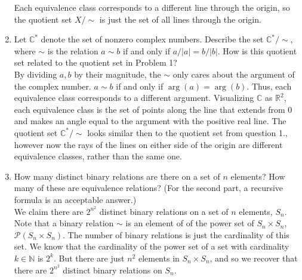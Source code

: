 \documentclass{article}
\newcommand{\C}{{\mathbb C}}
\newcommand{\R}{{\mathbb R}}
\newcommand{\N}{{\mathbb N}}
\begin{document}
\begin{enumerate}
		Each equivalence class corresponds to a different line through the origin,
		so the quotient set $X /\sim$
		is just the set of all lines through the origin.
	\item Let $\C^*$ denote the set of nonzero complex numbers.
		Describe the set $\C^*/\sim$,
		where $\sim$ is the relation $a \sim b$
		if and only if $a/\lvert a \rvert = b/\lvert b\rvert$.
		How is this quotient set related to the quotient set in Problem 1?\\
		By dividing $a,b$ by their magnitude,
		the $\sim$ only cares about the argument of the complex number.
		$a \sim b$ if and only if $\arg(a) = \arg(b)$.
		Thus, each equivalence class corresponds to a different argument.
		Visualizing $\C$ as $\R^2$,
		each equivalence class is the set of points along the line
		that extends from $0$ and makes an angle equal to the argument
		with the positive real line.
		The quotient set $\C^*/\sim$
		looks similar then to the quotient set from question 1.,
		however now the rays of the lines on either side of the origin
		are different equivalence classes,
		rather than the same one.
	\item How many distinct binary relations are there on a set of $n$ elements?
		How many of these are equivalence relations?
		(For the second part, a recursive formula is an acceptable answer.)\\
		We claim there are $2^{n^2}$ distinct binary relations
		on a set of $n$ elements, $S_n$.
		Note that a binary relation $\sim$ is an element of
		of the power set of $S_n \times S_n$,
		$\mathcal{P}(S_n \times S_n)$.
		The number of binary relations is just the cardinality of this set.
		We know that the cardinality of the power set of a set
		with cardinality $k \in \N$ is $2^k$.
		But there are just $n^2$ elements in $S_n \times S_n$,
		and so we recover that there are $2^{n^2}$ distinct binary relations on $S_n$.


\end{enumerate}
\end{document}
